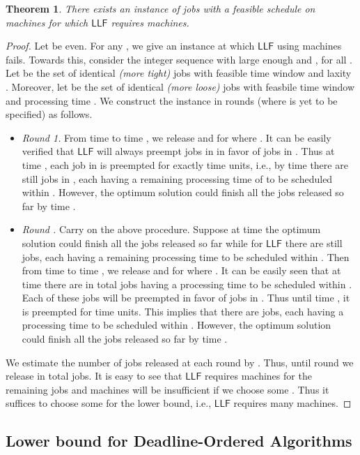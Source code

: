 \documentclass[letterpaper,11pt]{article}
\newtheorem{theorem}{Theorem}
\newcommand{\LLF}{\ensuremath{\mathsf{LLF}}\xspace}
\begin{document}
\begin{theorem}\label{thm:LLF-lower-bound}
  There exists an instance of  jobs with a feasible schedule on  machines for which \LLF requires  machines.
\end{theorem}
\begin{proof}
Let  be even. For any , we give an instance at which \LLF using  machines fails. Towards this, consider the integer sequence  with  large enough and , for all . Let  be the set of  identical {\em (more tight)} jobs with feasible time window  and laxity . Moreover, let  be the set of  identical {\em (more loose)} jobs with feasbile time window  and processing time . We construct the instance in  rounds (where  is yet to be specified) as follows.

\begin{itemize}
\item {\em Round 1.} From time  to time , we release  and  for  where . It can be easily verified that \LLF will always preempt jobs in  in favor of jobs in . Thus at time , each job in  is preempted for exactly  time units, i.e., by time  there are still  jobs in , each having a remaining processing time of  to be scheduled within . However, the optimum solution could finish all the jobs released so far by time . 

\item {\em  Round .} Carry on the above procedure. Suppose at time  the optimum solution could finish all the jobs released so far while for \LLF there are still  jobs, each having a remaining processing time  to be scheduled within . Then from time  to time , we release  and  for  where .
It can be easily seen that at time  there are in total  jobs having a processing time  to be scheduled within . Each of these jobs will be preempted in favor of jobs in . Thus until time , it is preempted for  time units. This implies that there are  jobs, each having a processing time  to be scheduled within . However, the optimum solution could finish all the jobs released so far by time .
\end{itemize}

We estimate the number of jobs released at each round by . Thus, until round  we release in total  jobs. It is easy to see that \LLF requires  machines for the remaining jobs and  machines will be insufficient if we choose some . Thus it suffices to choose some  for the lower bound, i.e., \LLF requires  many machines.
\end{proof}

\subsection{Lower bound for Deadline-Ordered Algorithms}
\end{document}

